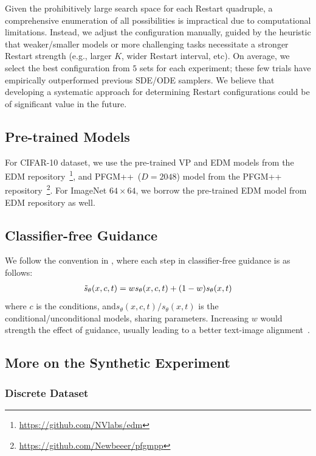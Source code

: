 Given the prohibitively large search space for each Restart quadruple, a comprehensive enumeration of all possibilities is impractical due to computational limitations. Instead, we adjust the configuration manually, guided by the heuristic that weaker/smaller models or more challenging tasks necessitate a stronger Restart strength (e.g., larger $K$, wider Restart interval, etc). On average, we select the best configuration from $5$ sets for each experiment; these few trials have empirically outperformed previous SDE/ODE samplers. We believe that developing a systematic approach for determining Restart configurations could be of significant value in the future.

\subsection{Pre-trained Models}

For CIFAR-10 dataset, we use the pre-trained VP and EDM models from the EDM repository~\footnote{\url{https://github.com/NVlabs/edm}}, and PFGM++~($D=2048$) model from the PFGM++ repository~\footnote{\url{https://github.com/Newbeeer/pfgmpp}}. For ImageNet $64\times 64$, we borrow the pre-trained EDM model from EDM repository as well.


\subsection{Classifier-free Guidance}

We follow the convention in \cite{Saharia2022PhotorealisticTD}, where each step in classifier-free guidance is as follows:
\begin{align*}
    \Tilde{s}_\theta(x,c, t) = w{s}_\theta(x,c, t) + (1-w){s}_\theta(x, t)
\end{align*}
where $c$ is the conditions, and${s}_\theta(x,c, t)/{s}_\theta(x, t)$ is the conditional/unconditional models, sharing parameters. Increasing $w$ would strength the effect of guidance, usually leading to a better text-image alignment~\cite{Saharia2022PhotorealisticTD}.

\subsection{More on the Synthetic Experiment}
\label{app:syn}

\subsubsection{Discrete Dataset}

